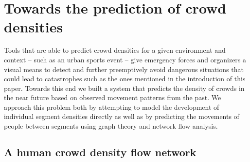 \documentclass[12pt,a4paper,twoside,openright]{book}
\begin{document}
\section{Towards the prediction of crowd densities}
\label{sec:predicting}

Tools that are able to predict crowd densities for a given environment and context -- such as an urban sports event -- give emergency forces and organizers a visual means to detect and further preemptively avoid dangerous situations that could lead to catastrophes \cite{Johansson2012} such as the ones mentioned in the introduction of this paper.
%
Towards this end we built a system that predicts the density of crowds in the near future based on observed movement patterns from the past.
%
We approach this problem both by attempting to model the development of individual segment densities directly as well as by predicting the movements of people between segments using graph theory and network flow analysis.

\subsection{A human crowd density flow network}
\label{subsec:human-density-flow-network}
\end{document}
